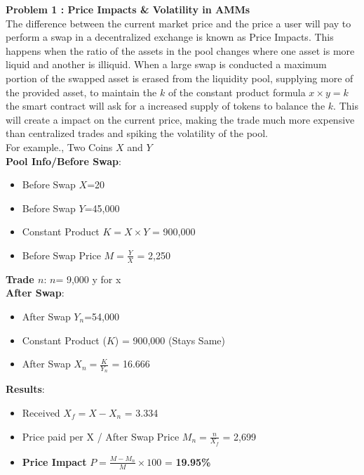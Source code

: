 \documentclass[conference]{IEEEtran}
\begin{document}
\textbf{Problem 1 : Price Impacts \& Volatility in AMMs}\\

The difference between the current market price and the price a user will pay to perform a swap in a decentralized exchange is known as Price Impacts. This happens when the ratio of the assets in the pool changes where one asset is more liquid and another is illiquid. When a large swap is conducted a maximum portion of the swapped asset is erased from the liquidity pool, supplying more of the provided asset, to maintain the $k$ of the constant product formula $x \times y=k$ the smart contract will ask for a increased supply of tokens to balance the $k$. This will create a impact on the current price, making the trade much more expensive than centralized trades and spiking the volatility of the pool.\\



For example., Two Coins $X$ and $Y$\\

\textbf{Pool Info/Before Swap}:
\begin{itemize}[wide, labelwidth=!, labelindent=0pt]
\item Before Swap $X$=20
\item Before Swap $Y$=45,000
\item Constant Product $K=X \times  Y$ = 900,000 
\item Before Swap Price $M=\frac{Y}{X}$ = 2,250 
\end{itemize}

\textbf{Trade $n$}: $n$= 9,000 y for x\\

\textbf{After Swap}:
\begin{itemize}[wide, labelwidth=!, labelindent=0pt]
\item After Swap $Y_n$=54,000 
\item Constant Product ($K$) = 900,000 (Stays Same)
\item After Swap $X_n=\frac{K}{Y_n}$ = 16.666  
\end{itemize}
\textbf{Results}:
\begin{itemize}[wide, labelwidth=!, labelindent=0pt]
\item Received $X_f={{X}-{X_n}}$ = 3.334 
\item Price paid per X / After Swap Price $M_n={\frac{n}{X_f}}$  = 2,699  
\item \textbf{Price Impact} $P={\frac{M - M_n}{M} \times  100}$ = \textbf{19.95\% }
\end{itemize}
\end{document}
